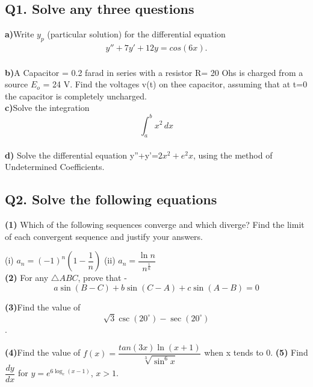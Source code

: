 \documentclass[12pt]{article}
\begin{document}
\subsection*{Q1. Solve any three questions }
\textbf{a)}Write  $y_p$ (particular solution) for the differential equation 
\begin{align*}
y''+7y'+12y=cos(6x).
\end{align*}
\\ \textbf{b)}A Capacitor = 0.2 farad in series with a resistor R= 20 Ohs is charged from a source $E_o$ = 24 V. Find the voltages v(t) on thee capacitor, assuming that at t=0 the capacitor is completely uncharged.
\linebreak
\\ \textbf{c)}Solve the integration 
\[ \int_{a}^{b} x^2 \,dx \]
\linebreak
\\ \textbf{d)} Solve the differential equation y''+y'=$2x^2+e^2x$, using the method of Undetermined Coefficients.\\
\subsection*{Q2. Solve the following equations}
\vspace{5mm}
\textbf{(1)} Which of the following sequences converge and which diverge? Find the limit of each convergent sequence and justify your answers.\linebreak

(i) $a_n = (-1)^n(1 - \dfrac{1}{n})$ \hspace{15mm} (ii) $a_n = \dfrac{\ln n}{n^{\frac{1}{n}}}$\\
\vspace{5mm}
\textbf{(2)} For any $\triangle ABC$, prove that -\\
$$a \sin (B-C) + b \sin (C - A) + c \sin (A-B) = 0$$
\linebreak

\textbf{(3)}Find the value of $$\sqrt{3} \csc (20^{\circ}) - \sec (20^{\circ})$$.
\linebreak

\textbf{(4)}Find the value of $f(x) = \dfrac{tan(3x) \ln (x+1)}{\sqrt[3]{\sin^6 x}}$ when x tends to 0.
\vspace{5mm}
\linebreak
\textbf{(5)} Find $\dfrac{dy}{dx}$ for $ y = e^{6 \log_e (x-1)}$, $ x > 1$.\\
\end{document}
